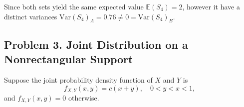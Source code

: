 \documentclass[letterpaper,12pt]{article}
\begin{document}
\begin{enumerate}[(a)]
\begin{list}{}{}
        Since both sets yield the same expected value $\mathbb{E}(S_4) = 2$, however it have a distinct variances $\text{Var}(S_4)_A = 0.76 \neq 0 = \text{Var}(S_4)_B$.
    \end{list}
\end{enumerate}

\vspace{1.5em}    

\subsection*{Problem 3. Joint Distribution on a Nonrectangular Support \hfill \mdseries[16 points]}

Suppose the joint probability density function of $X$ and $Y$ is
\[
f_{X,Y}(x, y) = c(x + y), \quad 0 < y < x < 1,
\]
and $f_{X,Y}(x, y) = 0$ otherwise.
\end{document}
